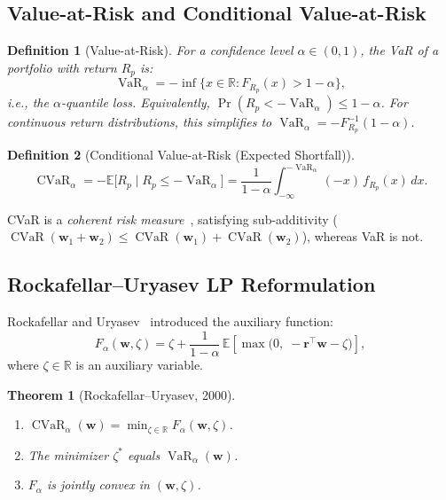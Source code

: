 \documentclass[12pt,a4paper]{article}
\newtheorem{definition}{Definition}[section]
\newtheorem{theorem}{Theorem}[section]
\newcommand{\E}{\mathbb{E}}
\newcommand{\R}{\mathbb{R}}
\DeclareMathOperator{\CVaR}{CVaR}
\DeclareMathOperator{\VaR}{VaR}
\begin{document}
\subsection{Value-at-Risk and Conditional Value-at-Risk}

\begin{definition}[Value-at-Risk]
For a confidence level $\alpha \in (0,1)$, the VaR of a portfolio with return $R_p$ is:
\begin{equation}
    \VaR_\alpha = -\inf\bigl\{x \in \R : F_{R_p}(x) > 1 - \alpha\bigr\},
    \label{eq:var}
\end{equation}
i.e., the $\alpha$-quantile loss. Equivalently, $\Pr(R_p < -\VaR_\alpha) \leq 1 - \alpha$. For continuous return distributions, this simplifies to $\VaR_\alpha = -F_{R_p}^{-1}(1-\alpha)$.
\end{definition}

\begin{definition}[Conditional Value-at-Risk (Expected Shortfall)]
\begin{equation}
    \CVaR_\alpha = -\E\bigl[R_p \mid R_p \leq -\VaR_\alpha\bigr]
    = \frac{1}{1 - \alpha}\int_{-\infty}^{-\VaR_\alpha} (-x)\,f_{R_p}(x)\,dx.
    \label{eq:cvar}
\end{equation}
\end{definition}

CVaR is a \emph{coherent risk measure}~\cite{artzner1999}, satisfying sub-additivity ($\CVaR(\bm{w}_1 + \bm{w}_2) \leq \CVaR(\bm{w}_1) + \CVaR(\bm{w}_2)$), whereas VaR is not.

\subsection{Rockafellar--Uryasev LP Reformulation}

Rockafellar and Uryasev~\cite{rockafellar2000} introduced the auxiliary function:
\begin{equation}
    F_\alpha(\bm{w}, \zeta) = \zeta + \frac{1}{1 - \alpha}\,
        \E\!\left[\max\bigl(0,\; -\bm{r}^\top\bm{w} - \zeta\bigr)\right],
    \label{eq:ru-auxiliary}
\end{equation}
where $\zeta \in \R$ is an auxiliary variable.

\begin{theorem}[Rockafellar--Uryasev, 2000]
\begin{enumerate}[nosep]
    \item $\CVaR_\alpha(\bm{w}) = \min_{\zeta \in \R} F_\alpha(\bm{w}, \zeta)$.
    \item The minimizer $\zeta^*$ equals $\VaR_\alpha(\bm{w})$.
    \item $F_\alpha$ is jointly convex in $(\bm{w}, \zeta)$.
\end{enumerate}
\end{theorem}
\end{document}
